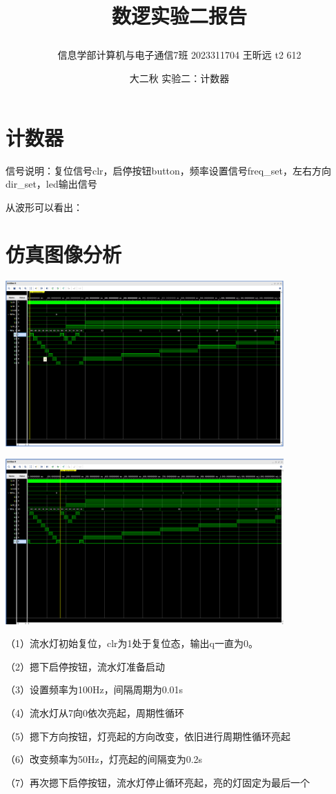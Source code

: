 \documentclass{article} %
\begin{document}
    \title{\centerline{数逻实验二报告}}
    \date{大二秋 实验二：计数器}
    \author{信息学部计算机与电子通信7班 2023311704 王昕远 t2 612}
    \maketitle
    \thispagestyle{empty}


\section{计数器}

信号说明：复位信号clr，启停按钮button，频率设置信号freq\_set，左右方向dir\_set，led输出信号\par
从波形可以看出：\par

\section{仿真图像分析}
\includegraphics[width=0.8\textwidth]{1.png}\par
\includegraphics[width=0.8\textwidth]{2.png}\par
（1）流水灯初始复位，clr为1处于复位态，输出q一直为0。\par
（2）摁下启停按钮，流水灯准备启动\par
（3）设置频率为100Hz，间隔周期为0.01s\par
（4）流水灯从7向0依次亮起，周期性循环\par
（5）摁下方向按钮，灯亮起的方向改变，依旧进行周期性循环亮起\par
（6）改变频率为50Hz，灯亮起的间隔变为0.2s\par
（7）再次摁下启停按钮，流水灯停止循环亮起，亮的灯固定为最后一个\par
\end{document}
